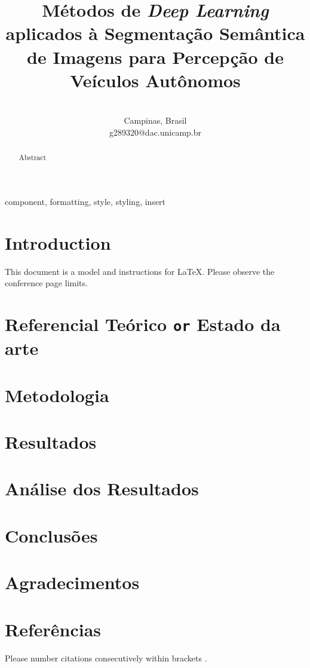 \documentclass[conference]{IEEEtran}
\begin{document}
\title{\huge{Métodos de \textit{Deep Learning} aplicados à Segmentação Semântica de Imagens para Percepção de Veículos Autônomos}
}

\author{
\\
Campinas, Brasil \\
g289320@dac.unicamp.br}

\maketitle

\begin{abstract}
Abstract
\end{abstract}

\begin{IEEEkeywords}
component, formatting, style, styling, insert
\end{IEEEkeywords}

\section{Introduction}
This document is a model and instructions for \LaTeX.
Please observe the conference page limits. 

\section{Referencial Teórico \texttt{or} Estado da arte}


\section{Metodologia}


\section{Resultados}


\section{Análise dos Resultados}


\section{Conclusões}



\section*{Agradecimentos}



\section*{Referências}

Please number citations consecutively within brackets \cite{geron2019hands}. 



\end{document}
